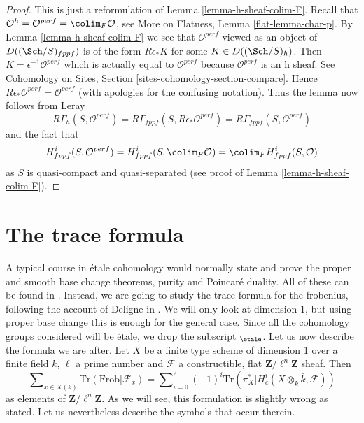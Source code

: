 \begin{proof}
This is just a reformulation of Lemma \ref{lemma-h-sheaf-colim-F}.
Recall that
$\mathcal{O}^h = \mathcal{O}^{perf} = \colim_F \mathcal{O}$, see
More on Flatness, Lemma \ref{flat-lemma-char-p}.
By Lemma \ref{lemma-h-sheaf-colim-F} we see that
$\mathcal{O}^{perf}$ viewed as an object of $D((\Sch/S)_{fppf})$
is of the form $R\epsilon_*K$ for some $K \in D((\Sch/S)_h)$.
Then $K = \epsilon^{-1}\mathcal{O}^{perf}$ which is actually
equal to $\mathcal{O}^{perf}$ because $\mathcal{O}^{perf}$ is an h sheaf. See
Cohomology on Sites, Section \ref{sites-cohomology-section-compare}.
Hence $R\epsilon_*\mathcal{O}^{perf} = \mathcal{O}^{perf}$
(with apologies for the confusing notation).
Thus the lemma now follows from Leray
$$
R\Gamma_h(S, \mathcal{O}^{perf}) =
R\Gamma_{fppf}(S, R\epsilon_*\mathcal{O}^{perf}) =
R\Gamma_{fppf}(S, \mathcal{O}^{perf})
$$
and the fact that
$$
H^i_{fppf}(S, \mathcal{O}^{perf}) =
H^i_{fppf}(S, \colim_F \mathcal{O}) =
\colim_F H^i_{fppf}(S, \mathcal{O})
$$
as $S$ is quasi-compact and quasi-separated
(see proof of Lemma \ref{lemma-h-sheaf-colim-F}).
\end{proof}









\section{The trace formula}
\label{section-trace-formula}

\noindent
A typical course in \'etale cohomology would normally state and prove the
proper and smooth base change theorems, purity and Poincar\'e duality. All of
these can be found in \cite[Arcata]{SGA4.5}. Instead, we are going to study the
trace formula for the frobenius, following the account of Deligne in
\cite[Rapport]{SGA4.5}. We will only look at dimension 1, but using proper base
change this is enough for the general case. Since all the cohomology groups
considered will be \'etale, we drop the subscript $_\etale$. Let us
now describe
the formula we are after. Let $X$ be a finite type scheme of dimension 1 over a
finite field $k$, $\ell$ a prime number and $\mathcal{F}$ a constructible, flat
$\mathbf{Z}/\ell^n\mathbf{Z}$ sheaf. Then
\begin{equation}
\label{equation-trace-formula-initial}
\sum\nolimits_{x \in X(k)}
\text{Tr}(\text{Frob} | \mathcal{F}_{\bar x}) =
\sum\nolimits_{i = 0}^2
(-1)^i \text{Tr}(\pi_X^* | H^i_c(X \otimes_k \bar k, \mathcal{F}))
\end{equation}
as elements of $\mathbf{Z}/\ell^n\mathbf{Z}$. As we will see, this formulation
is slightly wrong as stated. Let us nevertheless describe the symbols that
occur therein.




